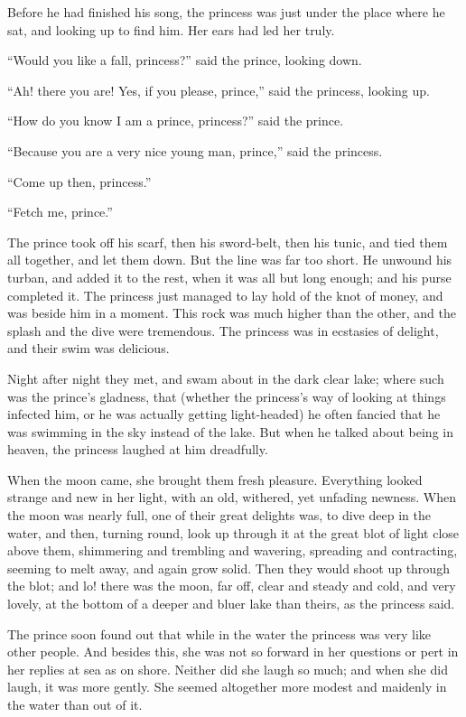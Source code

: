 \documentclass[12pt]{memoir}
\begin{document}
Before he had finished his song, the princess was just under the place
where he sat, and looking up to find him.  Her ears had led her truly.

``Would you like a fall, princess?'' said the prince, looking down.

``Ah! there you are!  Yes, if you please, prince,'' said the princess,
looking up.

``How do you know I am a prince, princess?'' said the prince.

``Because you are a very nice young man, prince,'' said the princess.

``Come up then, princess.''

``Fetch me, prince.''

The prince took off his scarf, then his sword-belt, then his tunic,
and tied them all together, and let them down.  But the line was far
too short.  He unwound his turban, and added it to the rest, when it
was all but long enough; and his purse completed it.  The princess
just managed to lay hold of the knot of money, and was beside him in a
moment.  This rock was much higher than the other, and the splash and
the dive were tremendous.  The princess was in ecstasies of delight,
and their swim was delicious.

Night after night they met, and swam about in the dark clear lake;
where such was the prince's gladness, that (whether the princess's way
of looking at things infected him, or he was actually getting
light-headed) he often fancied that he was swimming in the sky instead
of the lake.  But when he talked about being in heaven, the princess
laughed at him dreadfully.

When the moon came, she brought them fresh pleasure.  Everything
looked strange and new in her light, with an old, withered, yet
unfading newness.  When the moon was nearly full, one of their great
delights was, to dive deep in the water, and then, turning round, look
up through it at the great blot of light close above them, shimmering
and trembling and wavering, spreading and contracting, seeming to melt
away, and again grow solid.  Then they would shoot up through the
blot; and lo! there was the moon, far off, clear and steady and cold,
and very lovely, at the bottom of a deeper and bluer lake than theirs,
as the princess said.

The prince soon found out that while in the water the princess was
very like other people.  And besides this, she was not so forward in
her questions or pert in her replies at sea as on shore.  Neither did
she laugh so much; and when she did laugh, it was more gently.  She
seemed altogether more modest and maidenly in the water than out of
it.
\end{document}
